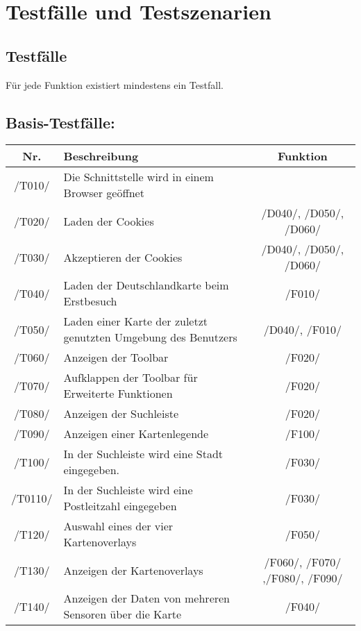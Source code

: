 \section{Testfälle und Testszenarien}
\subsection{Testfälle}

Für jede Funktion existiert mindestens ein Testfall.
\newline
\subsection{Basis-Testfälle:}
\begin{tabularx}{\textwidth}{| c | X | c |}
	\hline
	\textbf{Nr.} & 
    \textbf{Beschreibung} &
    \textbf{Funktion}\\
    \hline
     /T010/ & Die Schnittstelle wird in einem Browser geöffnet & \\
     \hline
     /T020/ & Laden der Cookies & /D040/, /D050/, /D060/\\
     \hline
     /T030/ & Akzeptieren der Cookies &  /D040/, /D050/, /D060/\\
     \hline
     /T040/ & Laden der Deutschlandkarte beim Erstbesuch& /F010/\\
     \hline
     /T050/ & Laden einer Karte der zuletzt genutzten Umgebung des Benutzers & /D040/, /F010/\\
     \hline
     /T060/ & Anzeigen der Toolbar & /F020/\\
     \hline
     /T070/ & Aufklappen der Toolbar für Erweiterte Funktionen & /F020/\\
     \hline
     /T080/ & Anzeigen der Suchleiste & /F020/\\
     \hline
     /T090/ & Anzeigen einer Kartenlegende & /F100/\\
     \hline
     /T100/ & In der Suchleiste wird eine Stadt eingegeben. & /F030/\\
     \hline
     /T0110/ & In der Suchleiste wird eine Postleitzahl eingegeben &  /F030/\\
     \hline
     /T120/ & Auswahl eines der vier Kartenoverlays & /F050/\\
     \hline
     /T130/ & Anzeigen der Kartenoverlays & /F060/, /F070/ ,/F080/, /F090/ \\
     \hline
     /T140/ & Anzeigen der Daten von mehreren Sensoren über die Karte & /F040/\\

\end{tabularx}
